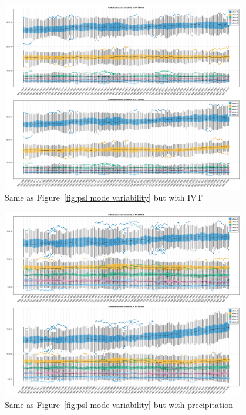 \begin{figure}
  \begin{center}
    \includegraphics[width=0.95\textwidth]{figures/mode_variability_ivt_50seasons.png}
  \end{center}
  \caption{Same as Figure~\ref{fig:psl mode variability} but with IVT}\label{fig:ivt mode variability}
\end{figure}


\begin{figure}
  \begin{center}
    \includegraphics[width=0.95\textwidth]{figures/mode_variability_pr_50seasons.png}
  \end{center}
  \caption{Same as Figure~\ref{fig:psl mode variability} but with precipitation}\label{fig:pr mode variability}
\end{figure}
